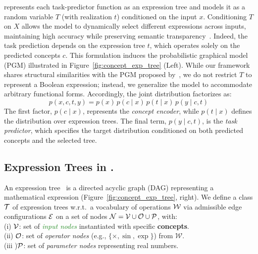 \documentclass{article}
\theoremstyle{plain}
\theoremstyle{definition}
\theoremstyle{remark}
\begin{document}
\classacro{} represents each task-predictor function as an expression tree and models it as a random variable $T$ (with realization $t$) conditioned on the input $x$. Conditioning $T$ on $X$ allows the model to dynamically select different expressions across inputs, maintaining high accuracy while preserving semantic transparency~\citep{barbiero2023,de2025,de2025causally}. Indeed, the task prediction depends on the expression tree  $t$, which operates solely on the predicted concepts $c$. This formulation induces the probabilistic graphical model (PGM) illustrated in Figure~\ref{fig:concept_exp_tree} (Left). While our framework shares structural similarities with the PGM proposed by~\citet{debot2024interpretable}, we do not restrict $T$ to represent a Boolean expression; instead, we generalize the model to accommodate arbitrary functional forms. Accordingly, the joint distribution factorizes as:
\begin{equation}
    p(x, c, t, y) = p(x)\, p(c \mid x)\, p(t \mid x)\, p(y \mid c, t)
    \label{eq:joint_factorization}
\end{equation}
The first factor, $p(c \mid x)$, represents the \emph{concept encoder}, while $p(t \mid x)$ defines the distribution over expression trees. The final term, $p(y \mid c, t)$, is the \emph{task predictor}, which specifies the target distribution conditioned on both predicted concepts and the selected tree. 

\subsection{Expression Trees in \classacro{}.}
\label{sec:our_exp_tree}

An expression tree~\citep{Mitchell1991} is a directed acyclic graph (DAG) representing a mathematical expression (Figure~\ref{fig:concept_exp_tree}, right). We define a class $\mathcal{T}$ of expression trees w.r.t.\ a vocabulary of operations $\mathcal{W}$ via admissible edge configurations $\mathcal{E}$ on a set of nodes $\mathcal{N} = \mathcal{V} \cup \mathcal{O} \cup \mathcal{P}$, with:
\\
\noindent (i) $\mathcal{V}$: set of \emph{\textcolor{ForestGreen}{input nodes}} instantiated with specific \textbf{concepts}.\\
\noindent (ii)
$\mathcal{O}$: set of \emph{\textcolor{MutedBlue}{operator nodes}} (e.g., $\{\times, \sin, \exp\}$) from $\mathcal{W}$.\\
\noindent (iii )$\mathcal{P}$: set of \emph{\textcolor{MutedRed}{parameter nodes}} representing real numbers.
\end{document}

